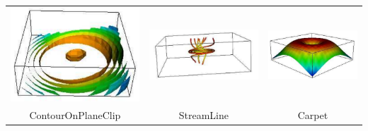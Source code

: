 \begin{table}[t]
\begin{tabular}{c c c}
\includegraphics[width=\thumbnailwidth]{figures/ContourOnPlaneClip} & 
\includegraphics[width=\thumbnailwidth]{figures/StreamLine} & 
\includegraphics[width=\thumbnailwidth]{figures/Carpet}  \\
ContourOnPlaneClip & StreamLine & Carpet \\

\end{tabular}
\end{table}
